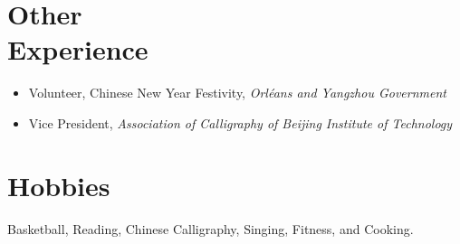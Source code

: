 \documentclass{mycv}
\begin{document}
\section{Other \\ Experience}
\begin{itemize}
  \itemsep 0em
  \item  Volunteer, Chinese New Year Festivity, \emph{Orl\'eans and Yangzhou Government} 
  \item Vice President, \emph{Association of Calligraphy of Beijing Institute of Technology} 
\end{itemize}

\section{Hobbies}
Basketball, Reading, Chinese Calligraphy, Singing, Fitness, and Cooking.
\end{document}
